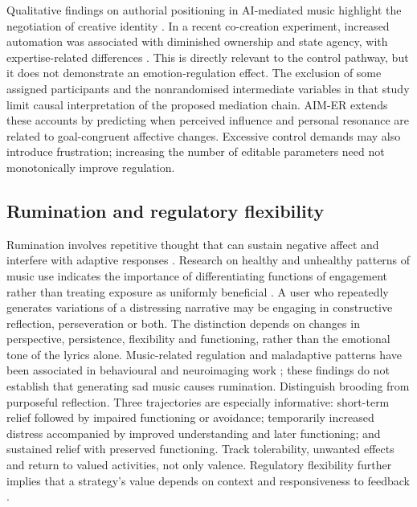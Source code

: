 \documentclass[11pt,a4paper]{article}
\begin{document}
Qualitative findings on authorial positioning in AI-mediated music highlight the negotiation of creative identity \citep{zhao2026}. In a recent co-creation experiment, increased automation was associated with diminished ownership and state agency, with expertise-related differences \citep{he2026}. This is directly relevant to the control pathway, but it does not demonstrate an emotion-regulation effect. The exclusion of some assigned participants and the nonrandomised intermediate variables in that study limit causal interpretation of the proposed mediation chain. AIM-ER extends these accounts by predicting when perceived influence and personal resonance are related to goal-congruent affective changes. Excessive control demands may also introduce frustration; increasing the number of editable parameters need not monotonically improve regulation.

\subsection{Rumination and regulatory flexibility}
Rumination involves repetitive thought that can sustain negative affect and interfere with adaptive responses \citep{nolen2008}. Research on healthy and unhealthy patterns of music use indicates the importance of differentiating functions of engagement rather than treating exposure as uniformly beneficial \citep{hums2015}. A user who repeatedly generates variations of a distressing narrative may be engaging in constructive reflection, perseveration or both. The distinction depends on changes in perspective, persistence, flexibility and functioning, rather than the emotional tone of the lyrics alone. Music-related regulation and maladaptive patterns have been associated in behavioural and neuroimaging work \citep{carlson2015}; these findings do not establish that generating sad music causes rumination. Distinguish brooding from purposeful reflection. Three trajectories are especially informative: short-term relief followed by impaired functioning or avoidance; temporarily increased distress accompanied by improved understanding and later functioning; and sustained relief with preserved functioning. Track tolerability, unwanted effects and return to valued activities, not only valence. Regulatory flexibility further implies that a strategy's value depends on context and responsiveness to feedback \citep{bonanno2013}.
\end{document}
